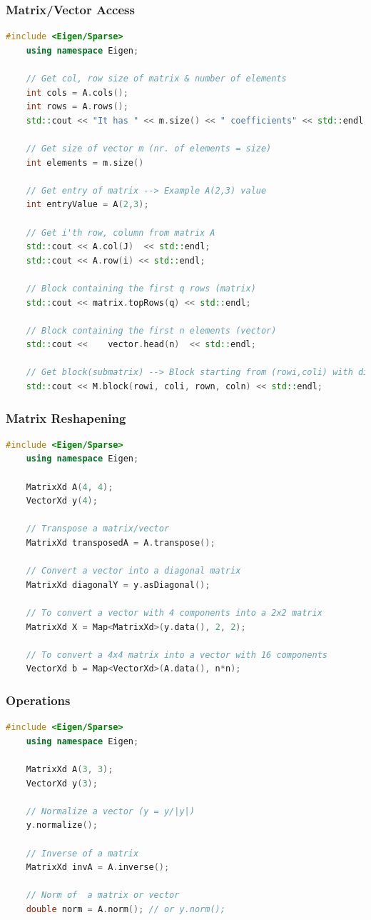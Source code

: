 \documentclass[12pt, a4paper]{article}
\begin{document}
\subsubsection{Matrix/Vector Access}
\begin{lstlisting}[language=C++]
	#include <Eigen/Sparse>
	using namespace Eigen;
	
	// Get col, row size of matrix & number of elements
	int cols = A.cols();
	int rows = A.rows();
	std::cout << "It has " << m.size() << " coefficients" << std::endl;
	
	// Get size of vector m (nr. of elements = size)
	int elements = m.size()
		
	// Get entry of matrix --> Example A(2,3) value
	int entryValue = A(2,3);
	
	// Get i'th row, column from matrix A
	std::cout << A.col(J)  << std::endl;
	std::cout << A.row(i) << std::endl;
	
	// Block containing the first q rows (matrix)
	std::cout << matrix.topRows(q) << std::endl;
	
	// Block containing the first n elements (vector)
	std::cout <<	vector.head(n)	<< std::endl;
	
	// Get block(submatrix) --> Block starting from (rowi,coli) with dimension (rown, coln)
	std::cout << M.block(rowi, coli, rown, coln) << std::endl;
\end{lstlisting}


\subsubsection{Matrix Reshapening}
\begin{lstlisting}[language=C++]
	#include <Eigen/Sparse>
	using namespace Eigen;
	
	MatrixXd A(4, 4);
	VectorXd y(4);
	
	// Transpose a matrix/vector
	MatrixXd transposedA = A.transpose();
	
	// Convert a vector into a diagonal matrix
	MatrixXd diagonalY = y.asDiagonal();
	
	// To convert a vector with 4 components into a 2x2 matrix
	MatrixXd X = Map<MatrixXd>(y.data(), 2, 2);
	
	// To convert a 4x4 matrix into a vector with 16 components
	VectorXd b = Map<VectorXd>(A.data(), n*n);
\end{lstlisting}

\subsubsection{Operations}
\begin{lstlisting}[language=C++]
	#include <Eigen/Sparse>
	using namespace Eigen;
	
	MatrixXd A(3, 3);
	VectorXd y(3);
	
	// Normalize a vector (y = y/|y|)
	y.normalize();
	
	// Inverse of a matrix
	MatrixXd invA = A.inverse();
	
	// Norm of  a matrix or vector
	double norm = A.norm(); // or y.norm();
\end{lstlisting}
\end{document}
